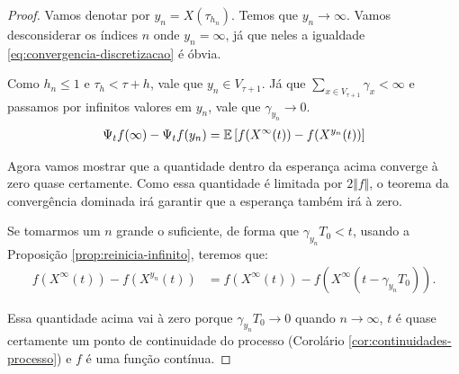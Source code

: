 \begin{proof}
  Vamos denotar por $y_n = X(\tau_{h_n})$. Temos que $y_n \to
  \infty$. Vamos desconsiderar os índices $n$ onde $y_n = \infty$, já
  que neles a igualdade \eqref{eq:convergencia-discretizacao} é óbvia.


  Como $h_n \leq 1$ e $\tau_h < \tau + h$, vale que $y_n \in V_{\tau +
    1}$. Já que $\sum_{x \in V_{\tau + 1}} \gamma_x < \infty$ e
  passamos por infinitos valores em $y_n$, vale que $\gamma_{y_n} \to
  0$.
  \begin{align*}
    \Psi_t f(\infty) - \Psi_t f (y_n)
    = {\mathbb{E}} \left[
      f(X^{\infty}(t)) - f(X^{y_n}(t))
    \right]
  \end{align*}

  Agora vamos mostrar que a quantidade dentro da esperança acima
  converge à zero quase certamente. Como essa quantidade é limitada
  por $2 \Vert f \Vert$, o teorema da convergência dominada irá
  garantir que a esperança também irá à zero.

  Se tomarmos um $n$ grande o suficiente, de forma que
  $\gamma_{y_n} T_0 < t$, usando a Proposição \ref{prop:reinicia-infinito},
  teremos que:
  \begin{align*}
    f(X^{\infty}(t)) - f(X^{y_n}(t)) &=
    f(X^{\infty}(t)) - f(X^{\infty}(t-\gamma_{y_n} T_0)).
  \end{align*}

  Essa quantidade acima vai à zero porque $\gamma_{y_n} T_0 \to 0$
  quando $n \to \infty$, $t$ é quase certamente um ponto de
  continuidade do processo (Corolário
  \ref{cor:continuidades-processo}) e $f$ é uma função contínua.
\end{proof}



